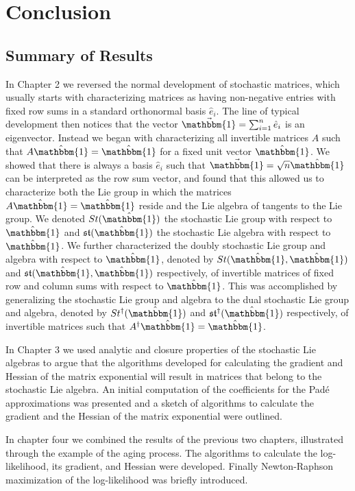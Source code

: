 \chapter{Conclusion}
\section{Summary of Results}
In Chapter 2 we reversed the normal development of stochastic matrices, which usually starts 
with characterizing matrices as having non-negative entries with fixed row sums in a
standard orthonormal basis $\hat{e}_i$. The line of typical development then notices that
the vector $\vec{\mathbbm{1}} = \sum_{i=1}^n \hat{e}_i$ is an eigenvector. Instead we began
with characterizing all invertible matrices $A$ such that $A \hat{\mathbbm{1}} = \hat{\mathbbm{1}}$
for a fixed unit vector $\hat{\mathbbm{1}}$. We showed that there is always a basis $\hat{e}_i$ 
such that $\vec{\mathbbm{1}} = \sqrt{n} \hat{\mathbbm{1}}$ can be interpreted as the row sum
vector, and found that this allowed us to characterize both the Lie group in which the 
matrices $A \hat{\mathbbm{1}} = \hat{\mathbbm{1}}$ reside and the Lie algebra of tangents to
the Lie group. We denoted $St(\hat{\mathbbm{1}})$ the stochastic Lie group with respect to $\hat{\mathbbm{1}}$ 
and $\mathfrak{st}(\hat{\mathbbm{1}})$ the stochastic Lie algebra with respect to $\hat{\mathbbm{1}}$. 
We further characterized the doubly stochastic Lie group and algebra with respect to $\hat{\mathbbm{1}}$, 
denoted by $St(\hat{\mathbbm{1}}, \hat{\mathbbm{1}})$ and $\mathfrak{st}(\hat{\mathbbm{1}}, \hat{\mathbbm{1}})$ 
respectively, of invertible matrices of fixed row and column sums with respect to $\hat{\mathbbm{1}}$. 
This was accomplished by generalizing the stochastic Lie group and algebra to the dual 
stochastic Lie group and algebra, denoted by $St^\dagger(\hat{\mathbbm{1}})$ and $\mathfrak{st}^\dagger(\hat{\mathbbm{1}})$ 
respectively, of invertible matrices such that $A^\dagger \hat{\mathbbm{1}} = \hat{\mathbbm{1}}$.

In Chapter 3 we used analytic and closure properties of the stochastic Lie algebras to argue 
that the algorithms developed for calculating the gradient and Hessian of the matrix
exponential will result in matrices that belong to the stochastic Lie algebra. An initial
computation of the coefficients for the Pad\'{e} approximations was presented and a sketch
of algorithms to calculate the gradient and the Hessian of the matrix exponential were 
outlined.

In chapter four we combined the results of the previous two chapters, illustrated through
the example of the aging process. The algorithms to calculate the log-likelihood, its
gradient, and Hessian were developed. Finally Newton-Raphson maximization of the 
log-likelihood was briefly introduced.
